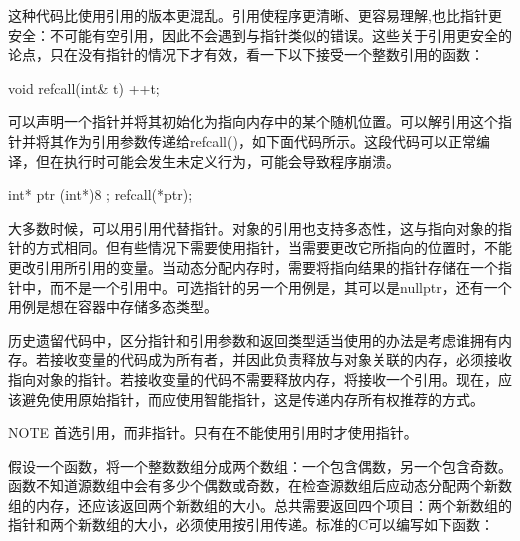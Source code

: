 这种代码比使用引用的版本更混乱。引用使程序更清晰、更容易理解,也比指针更安全：不可能有空引用，因此不会遇到与指针类似的错误。这些关于引用更安全的论点，只在没有指针的情况下才有效，看一下以下接受一个整数引用的函数：

\begin{cpp}
void refcall(int& t) { ++t; }
\end{cpp}

可以声明一个指针并将其初始化为指向内存中的某个随机位置。可以解引用这个指针并将其作为引用参数传递给refcall()，如下面代码所示。这段代码可以正常编译，但在执行时可能会发生未定义行为，可能会导致程序崩溃。

\begin{cpp}
int* ptr { (int*)8 };
refcall(*ptr);
\end{cpp}

大多数时候，可以用引用代替指针。对象的引用也支持多态性，这与指向对象的指针的方式相同。但有些情况下需要使用指针，当需要更改它所指向的位置时，不能更改引用所引用的变量。当动态分配内存时，需要将指向结果的指针存储在一个指针中，而不是一个引用中。可选指针的另一个用例是，其可以是nullptr，还有一个用例是想在容器中存储多态类型。

历史遗留代码中，区分指针和引用参数和返回类型适当使用的办法是考虑谁拥有内存。若接收变量的代码成为所有者，并因此负责释放与对象关联的内存，必须接收指向对象的指针。若接收变量的代码不需要释放内存，将接收一个引用。现在，应该避免使用原始指针，而应使用智能指针，这是传递内存所有权推荐的方式。

\begin{myNotic}{NOTE}
首选引用，而非指针。只有在不能使用引用时才使用指针。
\end{myNotic}

假设一个函数，将一个整数数组分成两个数组：一个包含偶数，另一个包含奇数。函数不知道源数组中会有多少个偶数或奇数，在检查源数组后应动态分配两个新数组的内存，还应该返回两个新数组的大小。总共需要返回四个项目：两个新数组的指针和两个新数组的大小，必须使用按引用传递。标准的C可以编写如下函数：


